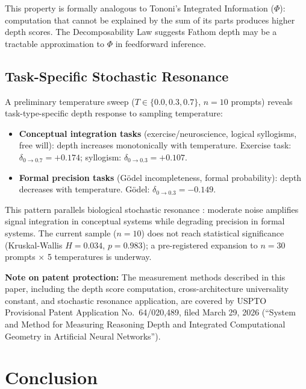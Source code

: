 \documentclass[10pt]{article}
\begin{document}
This property is formally analogous to Tononi's Integrated Information ($\Phi$): computation that cannot be explained by the sum of its parts produces higher depth scores. The Decomposability Law suggests Fathom depth may be a tractable approximation to $\Phi$ in feedforward inference.

\subsection{Task-Specific Stochastic Resonance}
\label{sec:stochastic}

A preliminary temperature sweep ($T \in \{0.0, 0.3, 0.7\}$, $n=10$ prompts) reveals task-type-specific depth response to sampling temperature:

\begin{itemize}
\item \textbf{Conceptual integration tasks} (exercise/neuroscience, logical syllogisms, free will): depth increases monotonically with temperature. Exercise task: $\delta_{0\to0.7}=+0.174$; syllogism: $\delta_{0\to0.3}=+0.107$.
\item \textbf{Formal precision tasks} (Gödel incompleteness, formal probability): depth decreases with temperature. Gödel: $\delta_{0\to0.3}=-0.149$.
\end{itemize}

This pattern parallels biological stochastic resonance \citep{wiesenfeld1995stochastic}: moderate noise amplifies signal integration in conceptual systems while degrading precision in formal systems. The current sample ($n=10$) does not reach statistical significance (Kruskal-Wallis $H=0.034$, $p=0.983$); a pre-registered expansion to $n=30$ prompts $\times$ 5 temperatures is underway.

\textbf{Note on patent protection:} The measurement methods described in this paper, including the depth score computation, cross-architecture universality constant, and stochastic resonance application, are covered by USPTO Provisional Patent Application No.~64/020,489, filed March 29, 2026 (``System and Method for Measuring Reasoning Depth and Integrated Computational Geometry in Artificial Neural Networks'').

\section{Conclusion}
\end{document}
